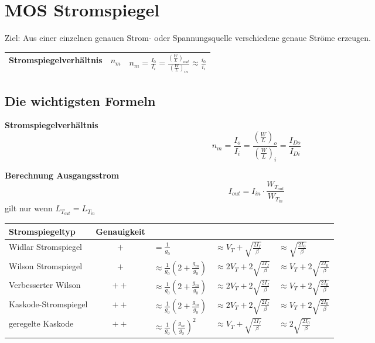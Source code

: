 \section{MOS Stromspiegel}
Ziel: Aus einer einzelnen genauen Strom- oder Spannungsquelle verschiedene genaue Ströme erzeugen.

\begin{tabularx}{\linewidth}{|l|l|X|}
	\hline
	Stromspiegelverhältnis & $n_m$ & $n_m = \frac{I_0}{I_i} = \frac{(\frac{W}{L})_{out}}{(\frac{W}{L})_{in}} \approx \frac{i_0}{i_i}$
	\\ \hline
\end{tabularx}

\subsection{Die wichtigsten Formeln}
\begin{multicols}{2}
	\textbf{Stromspiegelverhältnis}
	\[
		n_m = \frac{I_o}{I_i} 
			= \frac{\left(\frac{W}{L}\right)_o}{\left(\frac{W}{L}\right)_i}
			= \frac{I_{Do}}{I_{Di}}
	\]
	\columnbreak
		
	\textbf{Berechnung Ausgangsstrom}
	\[
		I_{out} = I_{in}\cdot\frac{W_{T_{out}}}{W_{T_{in}}}
	\]
	gilt nur wenn $L_{T_{out}} = L_{T_{in}}$
\end{multicols}


\begin{tabular}{|l|c|l|l|l|}
	\hline
	\textbf{Stromspiegeltyp} & \textbf{Genauigkeit} & \boldmath{$r_{out}$} & \boldmath{$V_I$} & \boldmath{$V_{O,min}$}
	\\ \hline
	Widlar Stromspiegel		& $+$	& $= \frac{1}{g_0}$								& $\approx V_T + \sqrt{\frac{2I_I}{\beta}}$		& $\approx \sqrt{\frac{2I_0}{\beta}}$
	\\ \hline
	Wilson Stromspiegel		& $+$	& $\approx \frac{1}{g_0}(2 + \frac{g_m}{g_0})$	& $\approx 2V_T + 2\sqrt{\frac{2I_I}{\beta}}$	& $\approx V_T + 2\sqrt{\frac{2I_0}{\beta}}$
	\\ \hline
	Verbesserter Wilson		& $++$	& $\approx \frac{1}{g_0}(2 + \frac{g_m}{g_0})$	& $\approx 2V_T + 2\sqrt{\frac{2I_I}{\beta}}$	& $\approx V_T + 2\sqrt{\frac{2I_0}{\beta}}$
	\\ \hline
	Kaskode-Stromspiegel	& $++$	& $\approx \frac{1}{g_0}(2 + \frac{g_m}{g_0})$	& $\approx 2V_T + 2\sqrt{\frac{2I_I}{\beta}}$	& $\approx V_T + 2\sqrt{\frac{2I_0}{\beta}}$
	\\ \hline
	geregelte Kaskode		& $++$	& $\approx \frac{1}{g_0}(\frac{g_m}{g_0})^2$	& $\approx V_T + \sqrt{\frac{2I_I}{\beta}}$		& $\approx 2\sqrt{\frac{2I_0}{\beta}}$
	\\ \hline
\end{tabular}



